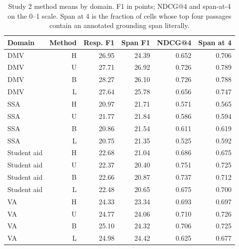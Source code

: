 \begin{table}[htbp]\centering\small
\caption{Study 2 method means by domain. F1 in points; NDCG@4 and span-at-4 on the 0--1 scale. Span at 4 is the fraction of cells whose top four passages contain an annotated grounding span literally.}\label{tab:domainmethods}
\begin{tabular}{lrrrrr}\toprule
Domain & Method & Resp. F1 & Span F1 & NDCG@4 & Span at 4\\\midrule
DMV & H & 26.95 & 24.39 & 0.652 & 0.706\\
DMV & U & 27.71 & 26.92 & 0.726 & 0.789\\
DMV & B & 28.27 & 26.10 & 0.726 & 0.788\\
DMV & L & 27.64 & 25.78 & 0.656 & 0.747\\
SSA & H & 20.97 & 21.71 & 0.571 & 0.565\\
SSA & U & 21.77 & 21.84 & 0.586 & 0.594\\
SSA & B & 20.86 & 21.54 & 0.611 & 0.619\\
SSA & L & 20.75 & 21.35 & 0.525 & 0.592\\
Student aid & H & 22.68 & 21.04 & 0.686 & 0.675\\
Student aid & U & 22.37 & 20.40 & 0.751 & 0.725\\
Student aid & B & 22.66 & 20.87 & 0.737 & 0.712\\
Student aid & L & 22.48 & 20.65 & 0.675 & 0.700\\
VA & H & 24.33 & 23.34 & 0.693 & 0.697\\
VA & U & 24.77 & 24.06 & 0.710 & 0.726\\
VA & B & 25.10 & 24.32 & 0.706 & 0.725\\
VA & L & 24.98 & 24.42 & 0.625 & 0.677\\
\bottomrule\end{tabular}\end{table}
